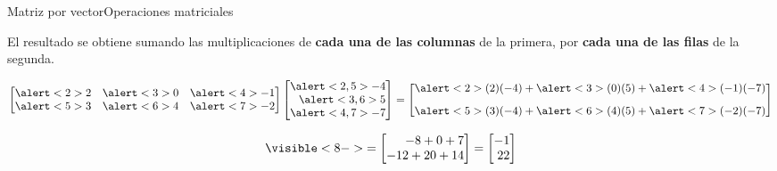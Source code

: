 \documentclass[spanish, c]{beamer}
\begin{document}
\begin{frame}{Matriz por vector}{Operaciones matriciales}    

    El resultado se obtiene sumando las multiplicaciones de \textbf{cada una de las columnas} de la primera, por \textbf{cada una de las filas} de la segunda.

    \[%
        \begin{bmatrix*}[r]
            \alert<2>{2} & \alert<3>{0} & \alert<4>{-1} \\
            \alert<5>{3} & \alert<6>{4} & \alert<7>{-2}
        \end{bmatrix*}
        \begin{bmatrix*}[r]
            \alert<2,5>{-4} \\
            \alert<3,6>{5} \\
            \alert<4,7>{-7}
        \end{bmatrix*} =
        \begin{bmatrix*}[r]
            \alert<2>{(2)(-4)} + \alert<3>{(0)(5)} + \alert<4>{(-1)(-7)} \\[2ex]
            \alert<5>{(3)(-4)} + \alert<6>{(4)(5)} + \alert<7>{(-2)(-7)}
        \end{bmatrix*}
    \]  \pause

    \bigskip

    \[%
        \visible<8->{=
        \begin{bmatrix*}[r]
            -8 + 0 + 7 \\
            -12 + 20 +14
        \end{bmatrix*} =
        \begin{bmatrix*}[r]
            -1 \\
            22
        \end{bmatrix*}}
    \]
    
\end{frame}
\end{document}
